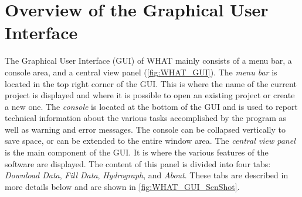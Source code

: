 \documentclass[WHATMANUAL.tex]{subfiles}
\begin{document}
\section{Overview of the Graphical User Interface}
\label{sec:GUI_overview}


The Graphical User Interface (GUI) of WHAT mainly consists of a menu bar, a console area, and a central view panel (\cref{fig:WHAT_GUI}). The \emph{menu bar} is located in the top right corner of the GUI. This is where the name of the current project is displayed and where it is possible to open an existing project or create a new one. The \emph{console} is located at the bottom of the GUI and is used to report technical information about the various tasks accomplished by the program as well as warning and error messages. The console can be collapsed vertically to save space, or can be extended to the entire window area. The \emph{central view panel} is the main component of the GUI. It is where the various features of the software are displayed. The content of this panel is divided into four tabs: \emph{Download Data}, \emph{Fill Data}, \emph{Hydrograph}, and \emph{About}. These tabs are described in more details below and are shown in \cref{fig:WHAT_GUI_ScnShot}.

\begin{figure}[!hb]
    \setlength{\fboxsep}{0pt}
    {
    }
\end{figure}
\end{document}
